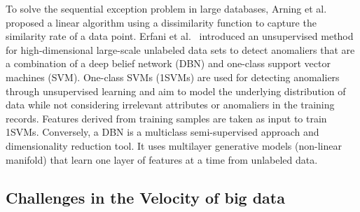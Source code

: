 To solve the sequential exception problem in large databases,
Arning et al.~\cite{arning1996linear} proposed a linear algorithm
using a dissimilarity function to capture the
similarity rate of a data point.
Erfani et al.~\cite{erfani2016high} introduced
an unsupervised method for high-dimensional large-scale
unlabeled data sets to detect anomaliers that
are a combination of a deep belief network (DBN) and one-class
support vector machines (SVM).
One-class SVMs (1SVMs) are used for detecting anomaliers
through unsupervised learning and aim to
model the underlying distribution of data while
not considering irrelevant attributes or
anomaliers in the training records.
Features derived from training samples are taken as input to train 1SVMs.
Conversely,
a DBN is
a multiclass semi-supervised approach and dimensionality reduction tool.
It uses multilayer
generative models (non-linear manifold) that learn one layer of features at a time
from unlabeled data.


\subsection{Challenges in the Velocity of big data}

